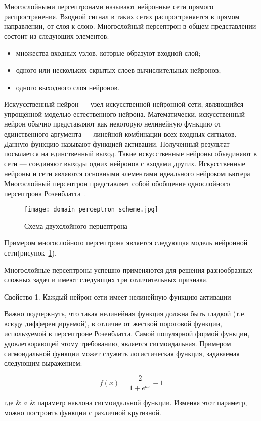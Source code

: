 Многослойными персептронами называют нейронные сети прямого распространения.
Входной сигнал в таких сетях распространяется в прямом направлении, от слоя к слою.
Многослойный персептрон в общем представлении состоит из следующих элементов:

\begin{itemize}
  \item множества входных узлов, которые образуют входной слой;
  \item одного или нескольких скрытых слоев вычислительных нейронов;
  \item одного выходного слоя нейронов.
\end{itemize}

Искуусственный нейрон --- узел искусственной нейронной сети, являющийся упрощённой моделью естественного нейрона. Математически, искусственный нейрон обычно представляют как некоторую нелинейную функцию от единственного аргумента --- линейной комбинации всех входных сигналов. Данную функцию называют функцией активации. Полученный результат посылается на единственный выход. Такие искусственные нейроны объединяют в сети --- соединяют выходы одних нейронов с входами других. Искусственные нейроны и сети являются основными элементами идеального нейрокомпьютера
Многослойный персептрон представляет собой обобщение однослойного персептрона Розенблатта~\cite{domain_rosenblatt}.

\begin{figure}[ht]
\centering
  \texttt{[image: domain\_perceptron\_scheme.jpg]}
  \caption{ Схема двухслойного перцептрона }
  \label{fig:perceptron_scheme}
\end{figure}

Примером многослойного персептрона является следующая модель нейронной сети(рисунок~\ref{fig:perceptron_scheme}).

Многослойные персептроны успешно применяются для решения разнообразных сложных задач и имеют следующих три отличительных признака.

Свойство 1. Каждый нейрон сети имеет нелинейную функцию активации

Важно подчеркнуть, что такая нелинейная функция должна быть гладкой (т.е. всюду дифференцируемой), в отличие от жесткой пороговой функции, используемой в персептроне Розенблатта.
Самой популярной формой функции, удовлетворяющей этому требованию, является сигмоидальная. Примером сигмоидальной функции может служить логистическая функция, задаваемая следующим выражением:

\begin{equation}
  \label{eq:domain:activation_function}
  f(x)=\frac{2}{1+e^{ax}}-1
\end{equation}
\begin{explanation}
  где & $ a $ & параметр наклона сигмоидальной функции. Изменяя этот параметр, можно построить функции с различной крутизной.
\end{explanation}

